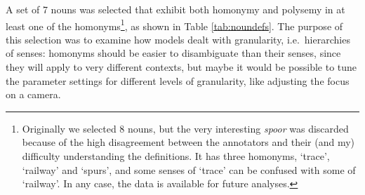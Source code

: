 \documentclass[
]{book}
\begin{document}
A set of 7 nouns was selected that exhibit both homonymy and polysemy in at least one of the homonyms\footnote{Originally we selected 8 nouns, but the very interesting \emph{spoor} was discarded because of the high disagreement between the annotators and their (and my) difficulty understanding the definitions. It has three homonyms, `trace', `railway' and `spurs', and some senses of `trace' can be confused with some of `railway'. In any case, the data is available for future analyses.}, as shown in Table \ref{tab:noundefs}. The purpose of this selection was to examine how models dealt with granularity, i.e.~hierarchies of senses: homonyms should be easier to disambiguate than their senses, since they will apply to very different contexts, but maybe it would be possible to tune the parameter settings for different levels of granularity, like adjusting the focus on a camera.

\renewcommand{\arraystretch}{1.4}



\begingroup\fontsize{7}{9}\selectfont
\end{document}
